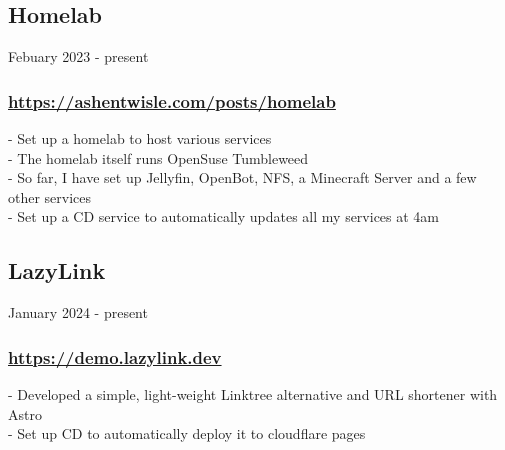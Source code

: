 \subsection{Homelab} Febuary 2023 - present \\
\subsubsection{\href{https://ashentwisle.com/posts/homelab-go-brrr}{https://ashentwisle.com/posts/homelab}}
-\:  Set up a homelab to host various services \\
-\:  The homelab itself runs OpenSuse Tumbleweed \\
-\:  So far, I have set up Jellyfin, OpenBot, NFS, a Minecraft Server and a few other services \\
-\:  Set up a CD service to automatically updates all my services at 4am \\

\subsection{LazyLink} January 2024 - present \\
\subsubsection{\href{https://demo.lazylink.dev}{https://demo.lazylink.dev}}
-\: Developed a simple, light-weight Linktree alternative and URL shortener with Astro \\
-\: Set up CD to automatically deploy it to cloudflare pages \\



